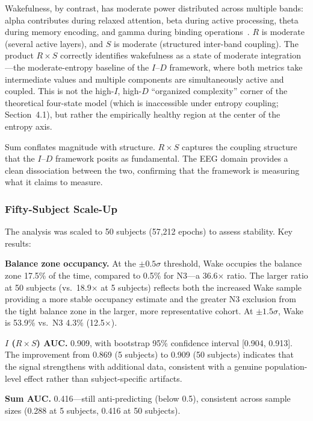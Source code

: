 \documentclass[12pt,a4paper]{article}
\begin{document}
Wakefulness, by contrast, has moderate power distributed across multiple bands: alpha contributes during relaxed attention, beta during active processing, theta during memory encoding, and gamma during binding operations~\cite{buzsaki2006}. $R$ is moderate (several active layers), and $S$ is moderate (structured inter-band coupling). The product $R \times S$ correctly identifies wakefulness as a state of moderate integration---the moderate-entropy baseline of the $I$--$D$ framework, where both metrics take intermediate values and multiple components are simultaneously active and coupled. This is not the high-$I$, high-$D$ ``organized complexity'' corner of the theoretical four-state model (which is inaccessible under entropy coupling; Section~4.1), but rather the empirically healthy region at the center of the entropy axis.

Sum conflates magnitude with structure. $R \times S$ captures the coupling structure that the $I$--$D$ framework posits as fundamental. The EEG domain provides a clean dissociation between the two, confirming that the framework is measuring what it claims to measure.

\subsubsection{Fifty-Subject Scale-Up}

The analysis was scaled to 50 subjects (57,212 epochs) to assess stability. Key results:

\textbf{Balance zone occupancy.} At the $\pm 0.5\sigma$ threshold, Wake occupies the balance zone 17.5\% of the time, compared to 0.5\% for N3---a 36.6$\times$ ratio. The larger ratio at 50 subjects (vs.\ 18.9$\times$ at 5 subjects) reflects both the increased Wake sample providing a more stable occupancy estimate and the greater N3 exclusion from the tight balance zone in the larger, more representative cohort. At $\pm 1.5\sigma$, Wake is 53.9\% vs.\ N3 4.3\% (12.5$\times$).

\textbf{$I$ ($R \times S$) AUC.} 0.909, with bootstrap 95\% confidence interval [0.904, 0.913]. The improvement from 0.869 (5 subjects) to 0.909 (50 subjects) indicates that the signal strengthens with additional data, consistent with a genuine population-level effect rather than subject-specific artifacts.

\textbf{Sum AUC.} 0.416---still anti-predicting (below 0.5), consistent across sample sizes (0.288 at 5 subjects, 0.416 at 50 subjects).
\end{document}
